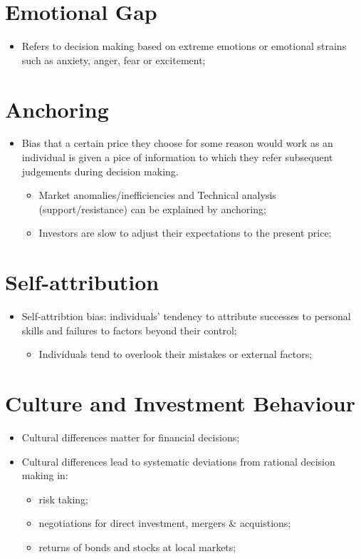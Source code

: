 \documentclass[11pt,a4paper]{report}
\begin{document}
\section{Emotional Gap}
\begin{itemize}
    \item Refers to decision making based on extreme emotions or emotional strains such as anxiety, anger, fear or excitement;
\end{itemize}
\section{Anchoring}
\begin{itemize}
    \item Bias that a certain price they choose for some reason would work as an individual is given a pice of information to which they refer subsequent judgements during decision making.
    \begin{itemize}
        \item Market anomalies/inefficiencies and Technical analysis (support/resistance) can be explained by anchoring;
        \item Investors are slow to adjust their expectations to the present price;
    \end{itemize}
\end{itemize}
\section{Self-attribution}
\begin{itemize}
    \item Self-attribtion bias: individuals' tendency to attribute successes to personal skills and failures to factors beyond their control;
    \begin{itemize}
        \item Individuals tend to overlook their mistakes or external factors;
    \end{itemize}
\end{itemize}
\section{Culture and Investment Behaviour}
\begin{itemize}
    \item Cultural differences matter for financial decisions;
    \item Cultural differences lead to systematic deviations from rational decision making in:
    \begin{itemize}
        \item risk taking;
        \item negotiations for direct investment, mergers \& acquistions;
        \item returns of bonds and stocks at local markets;
    \end{itemize}
\end{itemize}
\end{document}
